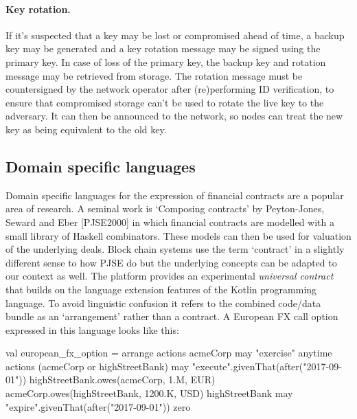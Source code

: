 \documentclass{article}
\begin{document}
\paragraph{Key rotation.} If it's suspected that a key may be lost or compromised ahead of time, a backup key
may be generated and a key rotation message may be signed using the primary key. In case of loss of the primary
key, the backup key and rotation message may be retrieved from storage. The rotation message must be countersigned
by the network operator after (re)performing ID verification, to ensure that compromised storage can't be used to
rotate the live key to the adversary. It can then be announced to the network, so nodes can treat the new key as
being equivalent to the old key.

\subsection{Domain specific languages}

Domain specific languages for the expression of financial contracts are a popular area of research. A seminal work
is `Composing contracts' by Peyton-Jones, Seward and Eber [PJSE2000\cite{PeytonJones:2000:CCA:357766.351267}] in
which financial contracts are modelled with a small library of Haskell combinators. These models can then be used
for valuation of the underlying deals. Block chain systems use the term `contract' in a slightly different sense to
how PJSE do but the underlying concepts can be adapted to our context as well. The platform provides an
experimental \emph{universal contract} that builds on the language extension features of the Kotlin programming
language. To avoid linguistic confusion it refers to the combined code/data bundle as an `arrangement' rather than
a contract. A European FX call option expressed in this language looks like this:

\begin{kotlincode}
    val european_fx_option = arrange {
        actions {
            acmeCorp may {
                "exercise" anytime {
                    actions {
                        (acmeCorp or highStreetBank) may {
                            "execute".givenThat(after("2017-09-01")) {
                                highStreetBank.owes(acmeCorp, 1.M, EUR)
                                acmeCorp.owes(highStreetBank, 1200.K, USD)
                            }
                        }
                    }
                }
            }
            highStreetBank may {
                "expire".givenThat(after("2017-09-01")) {
                    zero
                }
            }
        }
    }
\end{kotlincode}
\end{document}
